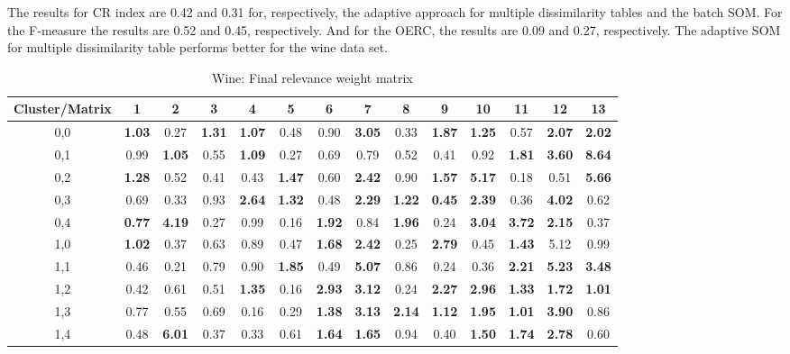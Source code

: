 \documentclass[10pt, conference, compsocconf]{IEEEtran}
\begin{document}
The results for CR index are 0.42 and 0.31 for, respectively, the adaptive approach for multiple dissimilarity tables and the batch SOM. For the F-measure the results are 0.52 and 0.45, respectively. And for the OERC, the results are 0.09 and 0.27, respectively. The adaptive SOM for multiple dissimilarity table performs better for the wine data set.

\begin{center}
\begin{table*}[ht]
\renewcommand{\arraystretch}{1.2}
\caption{Wine: Final relevance weight matrix}
\label{wine_pesos}
\centering
\begin{tabular}{|c|c|c|c|c|c|c|c|c|c|c|c|c|c|}
\hline
Cluster/Matrix & 1 & 2 & 3 & 4 & 5 & 6 & 7 & 8 & 9 & 10 & 11 & 12 & 13 \\ \hline
0,0 & \textbf{1.03} & 0.27 & \textbf{1.31} & \textbf{1.07} & 0.48 & 0.90 & \textbf{3.05} & 0.33 & \textbf{1.87} & \textbf{1.25} & 0.57 & \textbf{2.07} & \textbf{2.02} \\ \hline
0,1 & 0.99 & \textbf{1.05} & 0.55 & \textbf{1.09} & 0.27 & 0.69 & 0.79 & 0.52 & 0.41 & 0.92 & \textbf{1.81} & \textbf{3.60} & \textbf{8.64} \\ \hline
0,2 & \textbf{1.28} & 0.52 & 0.41 & 0.43 & \textbf{1.47} & 0.60 & \textbf{2.42} & 0.90 & \textbf{1.57} & \textbf{5.17} & 0.18 & 0.51 & \textbf{5.66} \\ \hline
0,3 & 0.69 & 0.33 & 0.93 & \textbf{2.64} & \textbf{1.32} & 0.48 & \textbf{2.29} & \textbf{1.22} & \textbf{0.45} & \textbf{2.39} & 0.36 & \textbf{4.02} & 0.62 \\ \hline
0,4 & \textbf{0.77} & \textbf{4.19} & 0.27 & 0.99 & 0.16 & \textbf{1.92} & 0.84 & \textbf{1.96} & 0.24 & \textbf{3.04} & \textbf{3.72} & \textbf{2.15} & 0.37 \\ \hline
1,0 & \textbf{1.02} & 0.37 & 0.63 & 0.89 & 0.47 & \textbf{1.68} & \textbf{2.42} & 0.25 & \textbf{2.79} & 0.45 & \textbf{1.43} & 5.12 & 0.99 \\ \hline
1,1 & 0.46 & 0.21 & 0.79 & 0.90 & \textbf{1.85} & 0.49 & \textbf{5.07} & 0.86 & 0.24 & 0.36 & \textbf{2.21} & \textbf{5.23} & \textbf{3.48} \\ \hline
1,2 & 0.42 & 0.61 & 0.51 & \textbf{1.35} & 0.16 & \textbf{2.93} & \textbf{3.12} & 0.24 & \textbf{2.27} & \textbf{2.96} & \textbf{1.33} & \textbf{1.72} & \textbf{1.01} \\ \hline
1,3 & 0.77 & 0.55 & 0.69 & 0.16 & 0.29 & \textbf{1.38} & \textbf{3.13} & \textbf{2.14} & \textbf{1.12} & \textbf{1.95} & \textbf{1.01} & \textbf{3.90} & 0.86 \\ \hline
1,4 & 0.48 & \textbf{6.01} & 0.37 & 0.33 & 0.61 & \textbf{1.64} & \textbf{1.65} & 0.94 & 0.40 & \textbf{1.50} & \textbf{1.74} & \textbf{2.78} & 0.60 \\ \hline

\end{tabular}
\end{table*}
\end{center}
\end{document}
